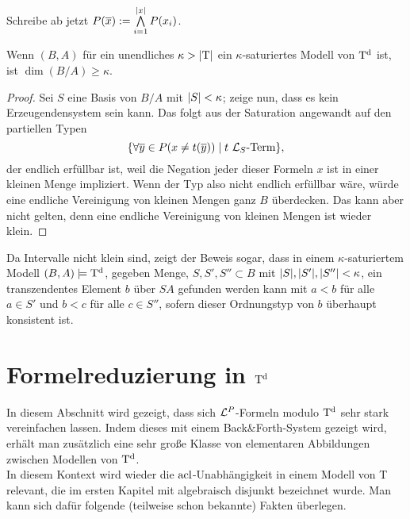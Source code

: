 \begin{definition}
	Schreibe ab jetzt $P(\overline{x}):=\bigwedge\limits_{i=1}^{\left| x \right|}P(x_i)$.
\end{definition}

\newpage

\begin{lemma}
	Wenn $(B,A)$ für ein unendliches $\kappa>{\left| \operatorname{T} \right|}$ ein $\kappa$-saturiertes Modell von $\operatorname{T^d}$ ist, ist $\dim(B/A)\geq\kappa$.
\end{lemma}
\begin{proof}
	Sei $S$ eine Basis von $B/A$ mit ${\left| S \right|}<\kappa$; zeige nun, dass es kein Erzeugendensystem sein kann. Das folgt aus der Saturation angewandt auf den partiellen Typen $$\{\forall\overline{y}\in P(x\neq t(\overline{y}))\mid t\ \mathcal{L}_S\text{-Term}\},$$ der endlich erfüllbar ist, weil die Negation jeder dieser Formeln \glqq{}$x$ ist in einer kleinen Menge\grqq{} impliziert. Wenn der Typ also nicht endlich erfüllbar wäre, würde eine endliche Vereinigung von kleinen Mengen ganz $B$ überdecken. Das kann aber nicht gelten, denn eine endliche Vereinigung von kleinen Mengen ist wieder klein.
\end{proof}

\begin{corollary}\label{Finden transz Elte}
	Da Intervalle nicht klein sind, zeigt der Beweis sogar, dass in einem $\kappa$-saturiertem Modell $(B,A)\models\operatorname{T^d}$, gegeben Menge, $S,S',S''\subset B$ mit ${\left| S \right|},{\left| S' \right|},{\left| S'' \right|}<\kappa$, ein transzendentes Element $b$ über $SA$ gefunden werden kann mit $a<b$ für alle $a\in S'$ und $b<c$ für alle $c\in S''$, sofern dieser Ordnungstyp von $b$ überhaupt konsistent ist.
\end{corollary}

\newpage

\section{Formelreduzierung in $\operatorname{T^d}$}
In diesem Abschnitt wird gezeigt, dass sich $\mathcal{L}^P$-Formeln modulo $\operatorname{T^d}$ sehr stark vereinfachen lassen. Indem dieses mit einem Back\&Forth-System gezeigt wird, erhält man zusätzlich eine sehr große Klasse von elementaren Abbildungen zwischen Modellen von $\operatorname{T^d}$.\\
In diesem Kontext wird wieder die $\operatorname{acl}$-Unabhängigkeit in einem Modell von T relevant, die im ersten Kapitel mit \glqq{}algebraisch disjunkt\grqq{} bezeichnet wurde. Man kann sich dafür folgende (teilweise schon bekannte) Fakten überlegen.

